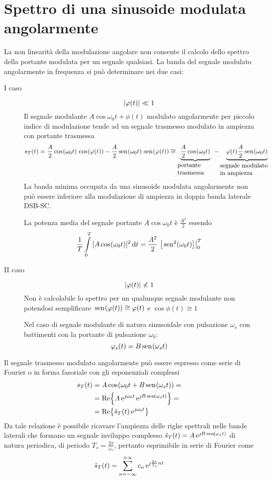 \section{Spettro di una sinusoide modulata angolarmente}
La non linearità della modulazione angolare non consente il calcolo dello spettro della portante modulata per un segnale qualsiasi. La banda del segnale modulato angolarmente in frequenza si può determinare nei due casi:
\begin{description}
\item[I caso] \[\abs{\phi(t)}\ll 1\] 
Il segnale modulante $A\cos{\omega_0 t+\phi(t)}$ modulato angolarmente per piccolo indice di modulazione tende ad un segnale trasmesso modulato in ampiezza con portante trasmessa
\[s_T(t)=\frac{A}{2}\cos{\omega_0 t}\cos{\phi(t)}-\frac{A}{2}\sen{\omega_0 t}\sen{\phi(t)}\cong \underbrace{\frac{A}{2}\cos{\omega_0 t}}_{\parbox[c]{2cm}{portante\\trasmessa}}-\underbrace{\phi(t)\frac{A}{2}\sen{\omega_0 t}}_{\parbox[c]{3cm}{segnale modulato\\in ampiezza}}\]
La banda minima occupata da una sinusoide modulata angolarmente non può essere inferiore alla modulazione di ampiezza in doppia banda laterale \ac{DSB-SC}.

La potenza media del segnale portante $A\cos{\omega_0 t}$ è $\frac{A^2}{2}$ essendo \[\frac{1}{T}\intd{0}{T}{[A\cos{\omega_0 t}]^2}{t}=\frac{A^2}{2}\bound{0}{T}{\sen[2]{\omega_0 t}}\]

\item[II caso] \[\abs{\phi(t)}\nless 1\] 
Non è calcolabile lo spettro per un qualunque segnale modulante non potendosi semplificare $\sen{\phi(t)}\cong\phi(t)$ e $\cos{\phi(t)}\cong 1$

Nel caso di segnale modulante di natura sinusoidale con pulsazione $\omega_s$ con battimenti con la portante di pulsazione $\omega_0$:
\[\phi_s(t)=B\sen{\omega_s t}\]
\end{description}

Il segnale trasmesso modulato angolarmente può essere espresso come serie di Fourier o in forma fasoriale con gli esponenziali complessi
\begin{equation}\begin{split}
s_T(t)&=A\cos{\omega_0 t+B\sen{\omega_s t}}=\\
&=\Re{A\e{\jmath\omega_0 t}\e{\jmath B\sen{\omega_s t}}}=\\
&=\Re{\tilde{s}_T(t)\e{\jmath\omega_0 t}}
\end{split}\end{equation}
Da tale relazione è possibile ricavare l'ampiezza delle righe spettrali nelle bande laterali che formano un segnale inviluppo complesso $\tilde{s}_T(t)=A\e{\jmath B\sen{\omega_s t}}$ di natura periodica, di periodo $T_s=\frac{2\pi}{\omega_s}$, pertanto esprimibile in serie di Fourier come
\begin{equation}
\tilde{s}_T(t)=\sum_{n=-\infty}^{+\infty}{c_n\e{\jmath \frac{2\pi}{T_s}n t}}
\end{equation}

